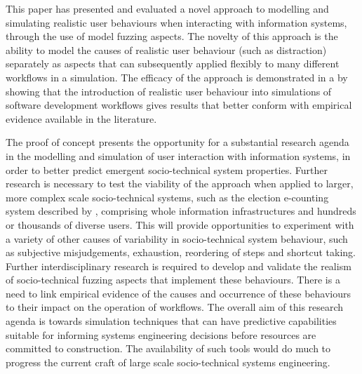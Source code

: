 \documentclass{llncs}
\begin{document}
This paper has presented and evaluated a novel approach to modelling and simulating realistic user behaviours when
interacting with information systems, through the use of model fuzzing aspects.  The novelty of this approach is the
ability to model the causes of realistic user behaviour (such as distraction) separately as aspects that can
subsequently applied flexibly to many different workflows in a simulation. The efficacy of the approach is demonstrated
in a by showing that the introduction of realistic user behaviour into simulations of software development workflows
gives results that better conform with empirical evidence available in the literature.

The proof of concept presents the opportunity for a substantial research agenda in the modelling and simulation of user
interaction with information systems, in order to better predict emergent socio-technical system properties. Further
research is necessary to test the viability of the approach when applied to larger, more complex scale socio-technical
systems, such as the election e-counting system described by \citet{lock07observations}, comprising whole information
infrastructures and hundreds or thousands of diverse users.  This will provide opportunities to experiment with a
variety of other causes of variability in socio-technical system behaviour, such as subjective misjudgements, exhaustion,
reordering of steps and shortcut taking.  Further interdisciplinary research is required to develop and validate the
realism of socio-technical fuzzing aspects that implement these behaviours. There is a need to link empirical evidence of
the causes and occurrence of these behaviours to their impact on the operation of workflows.  The overall aim of this
research agenda is towards simulation techniques that can have predictive capabilities suitable for informing systems
engineering decisions before resources are committed to construction.  The availability of such tools would do much to
progress the current craft of large scale socio-technical systems engineering.







\end{document}

